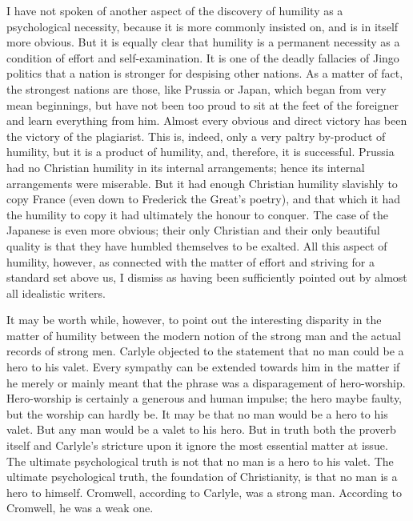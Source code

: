 I have not spoken of another aspect of the discovery of humility as a psychological necessity, because it is more commonly insisted on, and is in itself more obvious. But it is equally clear that humility is a permanent necessity as a condition of effort and self-examination. It is one of the deadly fallacies of Jingo politics that a nation is stronger for despising other nations. As a matter of fact, the strongest nations are those, like Prussia or Japan, which began from very mean beginnings, but have not been too proud to sit at the feet of the foreigner and learn everything from him. Almost every obvious and direct victory has been the victory of the plagiarist. This is, indeed, only a very paltry by-product of humility, but it is a product of humility, and, therefore, it is successful. Prussia had no Christian humility in its internal arrangements; hence its internal arrangements were miserable. But it had enough Christian humility slavishly to copy France (even down to Frederick the Great’s poetry), and that which it had the humility to copy it had ultimately the honour to conquer. The case of the Japanese is even more obvious; their only Christian and their only beautiful quality is that they have humbled themselves to be exalted. All this aspect of humility, however, as connected with the matter of effort and striving for a standard set above us, I dismiss as having been sufficiently pointed out by almost all idealistic writers.

It may be worth while, however, to point out the interesting disparity in the matter of humility between the modern notion of the strong man and the actual records of strong men. Carlyle objected to the statement that no man could be a hero to his valet. Every sympathy can be extended towards him in the matter if he merely or mainly meant that the phrase was a disparagement of hero-worship. Hero-worship is certainly a generous and human impulse; the hero maybe faulty, but the worship can hardly be. It may be that no man would be a hero to his valet. But any man would be a valet to his hero. But in truth both the proverb itself and Carlyle’s stricture upon it ignore the most essential matter at issue. The ultimate psychological truth is not that no man is a hero to his valet. The ultimate psychological truth, the foundation of Christianity, is that no man is a hero to himself. Cromwell, according to Carlyle, was a strong man. According to Cromwell, he was a weak one.

